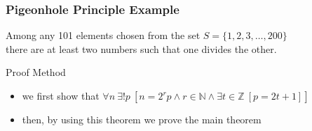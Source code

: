 \documentclass[dvipsnames]{beamer}
\begin{document}
\begin{frame}
  \frametitle{Pigeonhole Principle Example}

  \begin{theorem}
   Among any 101 elements chosen from the set $S = \{1,2,3,\dots,200\}$\\
   there are at least two numbers such that one divides the other.
  \end{theorem}

  \pause
  \begin{block}{Proof Method}
    \begin{itemize}
      \item we first show that
        $\forall n~\exists ! p~
          [n = 2^r p \wedge r \in \mathbb{N}
            \wedge \exists t \in \mathbb Z~[p = 2t + 1]]$\\

      \item then, by using this theorem we prove the main theorem
    \end{itemize}
  \end{block}
\end{frame}
\end{document}
